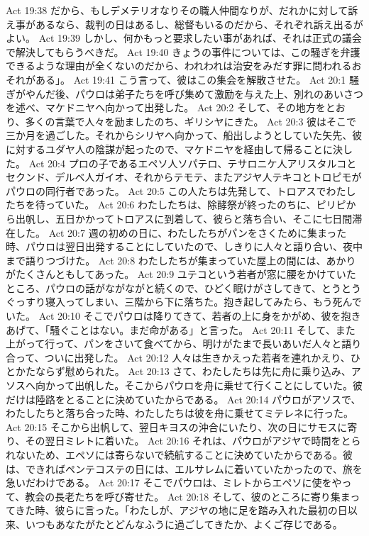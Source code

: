 Act 19:38  だから、もしデメテリオなりその職人仲間なりが、だれかに対して訴え事があるなら、裁判の日はあるし、総督もいるのだから、それぞれ訴え出るがよい。
Act 19:39  しかし、何かもっと要求したい事があれば、それは正式の議会で解決してもらうべきだ。
Act 19:40  きょうの事件については、この騒ぎを弁護できるような理由が全くないのだから、われわれは治安をみだす罪に問われるおそれがある」。
Act 19:41  こう言って、彼はこの集会を解散させた。
Act 20:1  騒ぎがやんだ後、パウロは弟子たちを呼び集めて激励を与えた上、別れのあいさつを述べ、マケドニヤへ向かって出発した。
Act 20:2  そして、その地方をとおり、多くの言葉で人々を励ましたのち、ギリシヤにきた。
Act 20:3  彼はそこで三か月を過ごした。それからシリヤへ向かって、船出しようとしていた矢先、彼に対するユダヤ人の陰謀が起ったので、マケドニヤを経由して帰ることに決した。
Act 20:4  プロの子であるエペソ人ソパテロ、テサロニケ人アリスタルコとセクンド、デルベ人ガイオ、それからテモテ、またアジヤ人テキコとトロピモがパウロの同行者であった。
Act 20:5  この人たちは先発して、トロアスでわたしたちを待っていた。
Act 20:6  わたしたちは、除酵祭が終ったのちに、ピリピから出帆し、五日かかってトロアスに到着して、彼らと落ち合い、そこに七日間滞在した。
Act 20:7  週の初めの日に、わたしたちがパンをさくために集まった時、パウロは翌日出発することにしていたので、しきりに人々と語り合い、夜中まで語りつづけた。
Act 20:8  わたしたちが集まっていた屋上の間には、あかりがたくさんともしてあった。
Act 20:9  ユテコという若者が窓に腰をかけていたところ、パウロの話がながながと続くので、ひどく眠けがさしてきて、とうとうぐっすり寝入ってしまい、三階から下に落ちた。抱き起してみたら、もう死んでいた。
Act 20:10  そこでパウロは降りてきて、若者の上に身をかがめ、彼を抱きあげて、「騒ぐことはない。まだ命がある」と言った。
Act 20:11  そして、また上がって行って、パンをさいて食べてから、明けがたまで長いあいだ人々と語り合って、ついに出発した。
Act 20:12  人々は生きかえった若者を連れかえり、ひとかたならず慰められた。
Act 20:13  さて、わたしたちは先に舟に乗り込み、アソスへ向かって出帆した。そこからパウロを舟に乗せて行くことにしていた。彼だけは陸路をとることに決めていたからである。
Act 20:14  パウロがアソスで、わたしたちと落ち合った時、わたしたちは彼を舟に乗せてミテレネに行った。
Act 20:15  そこから出帆して、翌日キヨスの沖合にいたり、次の日にサモスに寄り、その翌日ミレトに着いた。
Act 20:16  それは、パウロがアジヤで時間をとられないため、エペソには寄らないで続航することに決めていたからである。彼は、できればペンテコステの日には、エルサレムに着いていたかったので、旅を急いだわけである。
Act 20:17  そこでパウロは、ミレトからエペソに使をやって、教会の長老たちを呼び寄せた。
Act 20:18  そして、彼のところに寄り集まってきた時、彼らに言った。「わたしが、アジヤの地に足を踏み入れた最初の日以来、いつもあなたがたとどんなふうに過ごしてきたか、よくご存じである。
